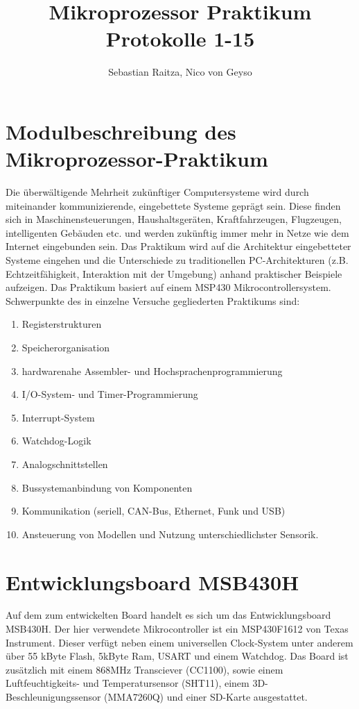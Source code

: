 \documentclass[11pt,german]{scrartcl}
\title{Mikroprozessor Praktikum\\Protokolle 1-15}
\author{Sebastian Raitza, Nico von Geyso}
\begin{document}
\maketitle

\section{Modulbeschreibung des Mikroprozessor-Praktikum}
Die überwältigende Mehrheit zukünftiger Computersysteme wird durch miteinander kommunizierende, eingebettete Systeme geprägt sein.
Diese finden sich in Maschinensteuerungen, Haushaltsgeräten, Kraftfahrzeugen, Flugzeugen, intelligenten Gebäuden etc. und
werden zukünftig immer mehr in Netze wie dem Internet eingebunden sein.
Das Praktikum wird auf die Architektur eingebetteter Systeme eingehen und die Unterschiede zu traditionellen PC-Architekturen 
(z.B. Echtzeitfähigkeit, Interaktion mit der Umgebung) anhand praktischer Beispiele aufzeigen. 
Das Praktikum basiert auf einem MSP430 Mikrocontrollersystem. 
Schwerpunkte des in einzelne Versuche gegliederten Praktikums sind: 
\begin{enumerate}
    \item Registerstrukturen
    \item Speicherorganisation
    \item hardwarenahe Assembler- und Hochsprachenprogrammierung
    \item I/O-System- und Timer-Programmierung
    \item Interrupt-System
    \item Watchdog-Logik
    \item Analogschnittstellen
    \item Bussystemanbindung von Komponenten
    \item Kommunikation (seriell, CAN-Bus, Ethernet, Funk und USB)
    \item Ansteuerung von Modellen und Nutzung unterschiedlichster Sensorik.
\end{enumerate}


\section{Entwicklungsboard MSB430H}
Auf dem zum entwickelten Board handelt es sich um das Entwicklungsboard MSB430H.
Der hier verwendete Mikrocontroller ist ein MSP430F1612 von Texas Instrument.
Dieser verfügt neben einem universellen Clock-System unter anderem über 55 kByte Flash, 5kByte Ram, USART und einem Watchdog.
Das Board ist zusätzlich mit einem 868MHz Transciever (CC1100),
sowie einem Luftfeuchtigkeits- und Temperatursensor (SHT11), einem 3D-Beschleunigungssensor (MMA7260Q)
und einer SD-Karte ausgestattet.
\end{document}
